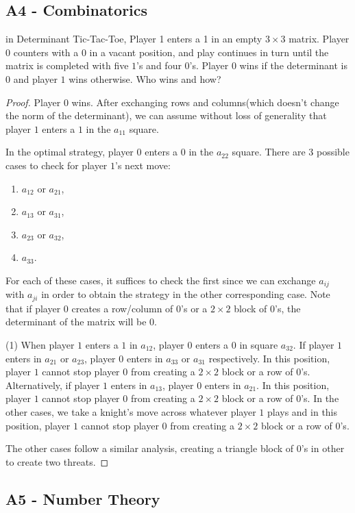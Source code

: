 \documentclass[11pt]{scrartcl}
\newcommand{\<}{\langle}
\renewcommand{\>}{\rangle}
\begin{document}
\subsection{A4 - Combinatorics}
in Determinant Tic-Tac-Toe, Player 1 enters a 1 in an empty $3 \times 3$ matrix.  Player $0$ counters with a $0$ in a vacant position, and play continues in turn until the matrix is completed with five $1$'s and four $0$'s.  Player $0$ wins if the determinant is $0$ and player $1$ wins otherwise.  Who wins and how?
\begin{proof}
Player $0$ wins.  After exchanging rows and columns(which doesn't change the norm of the determinant), we can assume without loss of generality that player $1$ enters a $1$ in the $a_{11}$ square.  

In the optimal strategy, player $0$ enters a $0$ in the $a_{22}$ square.  There are 3 possible cases to check for player $1$'s next move:
\begin{enumerate}
\item $a_{12}$ or $a_{21}$,
\item $a_{13}$ or $a_{31}$,
\item $a_{23}$ or $a_{32}$,
\item $a_{33}$.
\end{enumerate}
For each of these cases, it suffices to check the first since we can exchange $a_{ij}$ with $a_{ji}$ in order to obtain the strategy in the other corresponding case.  Note that if player $0$ creates a row/column of $0$'s or a $2 \times 2$ block of $0$'s, the determinant of the matrix will be $0$.

(1) When player $1$ enters a $1$ in $a_{12}$, player $0$ enters a $0$ in square $a_{32}$. If player $1$ enters in $a_{21}$ or $a_{23}$, player $0$ enters in $a_{33}$ or $a_{31}$ respectively. In this position, player $1$ cannot stop player $0$ from creating a $2 \times 2$ block or a row of $0$'s.   Alternatively, if player $1$ enters in $a_{13}$, player $0$ enters in $a_{21}$.  In this position, player $1$ cannot stop player $0$ from creating a $2 \times 2$ block or a row of $0$'s.  In the other cases, we take a knight's move across whatever player $1$ plays and in this position, player $1$ cannot stop player $0$ from creating a $2 \times 2$ block or a row of $0$'s.

The other cases follow a similar analysis, creating a triangle block of $0$'s in other to create two threats.  
\end{proof} 
\subsection{A5 - Number Theory}
\end{document}
